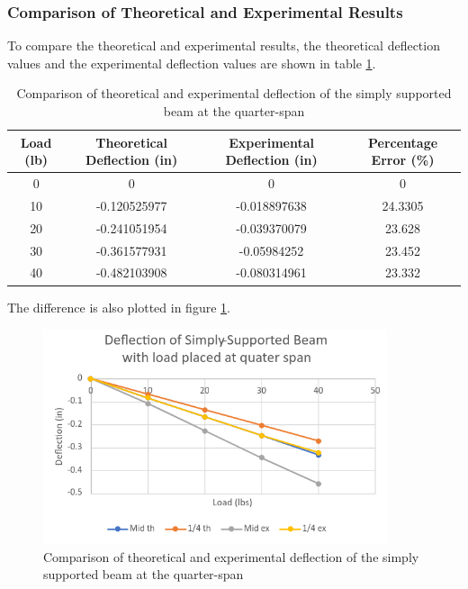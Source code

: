 \documentclass[12pt, titlepage]{article}
\begin{document}
\subsubsection{Comparison of Theoretical and Experimental Results}
To compare the theoretical and experimental results, the theoretical deflection
values and the experimental deflection values are shown in table \ref{tab:ComparisonSimplySupportedBeamQuarter}.
\begin{table}[H]
  \centering
  \caption{Comparison of theoretical and experimental deflection of the simply supported beam at the quarter-span}
  \label{tab:ComparisonSimplySupportedBeamQuarter}
  \begin{adjustwidth}{-1in}{-1in}
    \begin{tabular}{|c|c|c|c|}
        \hline
        \textbf{Load (lb)} & \textbf{Theoretical Deflection (in)} & \textbf{Experimental Deflection (in)} & \textbf{Percentage Error (\%)} \\
        \hline
        0 & 0 & 0 & 0 \\
        \hline
        10 & -0.120525977 & -0.018897638 & 24.3305 \\
        \hline
        20 & -0.241051954 & -0.039370079 & 23.628 \\
        \hline
        30 & -0.361577931 & -0.05984252 & 23.452 \\
        \hline
        40 & -0.482103908 & -0.080314961 & 23.332 \\
        \hline
    \end{tabular}
  \end{adjustwidth}
\end{table}
\newpage
The difference is also plotted in figure \ref{fig:ComparisonSimplySupportedBeamQuarter}.
\begin{figure}[H]
    \centering
    \includegraphics[width=0.9\textwidth]{./Images/S_Q_C.png}
    \caption{Comparison of theoretical and experimental deflection of the simply supported beam at the quarter-span}
    \label{fig:ComparisonSimplySupportedBeamQuarter}
\end{figure}
\newpage
\end{document}
